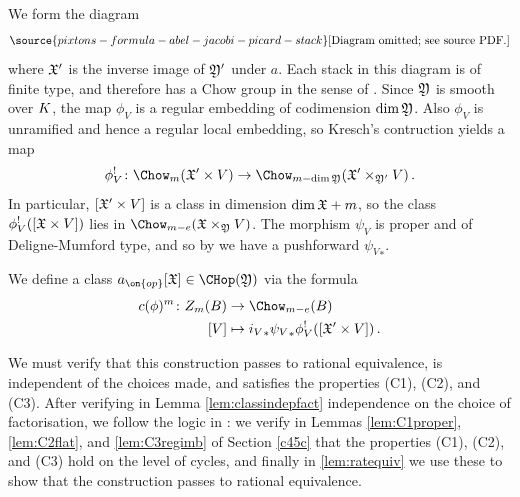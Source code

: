 We form the diagram
\begin{equation} \label{eq:definingdiagram}
\source{pixtons-formula-abel-jacobi-picard-stack}
 \text{[Diagram omitted; see source PDF.]}
\end{equation}
where $\frak X'$ is the inverse image of $\frak Y'$ under $a$. Each stack in this diagram is of finite type, and therefore has a Chow group in the sense of \cite{Kresch1999Cycle-groups-fo}. Since $\frak Y$ is  smooth over ${K}$, the map $\phi_V$ is a regular embedding of codimension $\dim \frak Y$. Also $\phi_V$ is unramified and hence a regular local embedding, so Kresch's contruction yields a map $$\phi_V^!\colon \Chow_m(\frak X' \times V) \to \Chow_{m-\dim \frak Y}(\frak X' \times_{\frak Y'} V)\, .$$
In particular, $[\frak X' \times V]$ is a class in dimension $\dim \frak X + m$, so the class $\phi_V^! ([\frak X \times V])$ lies in $\Chow_{m-e} (\frak X \times_{\frak Y} V)$.
The morphism $\psi_V$ is proper and of Deligne-Mumford type, and so by \cite[Appendix B]{BaeSchmitt1} we have a pushforward ${\psi_V}_*$. \begin{definition}\label{defbivariantclass}
We define a class $a_{\on{op}}[\frak X] \in \CHop(\frak Y)$
via the formula
\begin{align}
    c(\phi)^{m}\colon Z_m(B) &\to \Chow_{m-e}(B) \\
    [V] &\mapsto {i_V}_* {\psi_V}_* \phi_V^! ([\frak X' \times V])\, . \nonumber
\end{align}
\end{definition}
We must verify that this construction passes to rational equivalence, is independent of the choices made, and satisfies the properties (C1), (C2), and (C3).
After verifying in Lemma \ref{lem:classindepfact} independence on the choice of factorisation, we follow the logic in \cite{Fulton1984Intersection-th}: we verify in Lemmas \ref{lem:C1proper}, \ref{lem:C2flat}, and \ref{lem:C3regimb} of Section \ref{c45c} that the properties (C1), (C2), and (C3) hold on the level of cycles, and finally in \cref{lem:ratequiv} we use these to show that the construction passes to rational equivalence.



